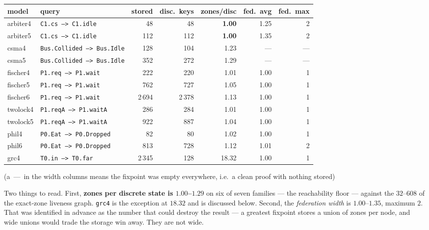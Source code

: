 \begin{center}\small
\begin{tabular}{llrrrrr}
\toprule
model & query & stored & disc.\ keys & zones/disc & fed.\ avg & fed.\ max \\
\midrule
arbiter4 & \texttt{C1.cs --> C1.idle}          & 48    & 48    & \textbf{1.00} & 1.25 & 2 \\
arbiter5 & \texttt{C1.cs --> C1.idle}          & 112   & 112   & \textbf{1.00} & 1.35 & 2 \\
csma4    & \texttt{Bus.Collided --> Bus.Idle}  & 128   & 104   & 1.23 & --- & --- \\
csma5    & \texttt{Bus.Collided --> Bus.Idle}  & 352   & 272   & 1.29 & --- & --- \\
fischer4 & \texttt{P1.req --> P1.wait}         & 222   & 220   & 1.01 & 1.00 & 1 \\
fischer5 & \texttt{P1.req --> P1.wait}         & 762   & 727   & 1.05 & 1.00 & 1 \\
fischer6 & \texttt{P1.req --> P1.wait}         & 2\,694& 2\,378& 1.13 & 1.00 & 1 \\
twolock4 & \texttt{P1.reqA --> P1.waitA}       & 286   & 284   & 1.01 & 1.00 & 1 \\
twolock5 & \texttt{P1.reqA --> P1.waitA}       & 922   & 887   & 1.04 & 1.00 & 1 \\
phil4    & \texttt{P0.Eat --> P0.Dropped}      & 82    & 80    & 1.02 & 1.00 & 1 \\
phil6    & \texttt{P0.Eat --> P0.Dropped}      & 813   & 728   & 1.12 & 1.01 & 2 \\
grc4     & \texttt{T0.in --> T0.far}           & 2\,345& 128   & 18.32& 1.00 & 1 \\
\bottomrule
\end{tabular}
\end{center}
\measured{} (a \,---\, in the width columns means the fixpoint was empty everywhere, i.e.\ a clean
proof with nothing stored)

Two things to read. First, \textbf{zones per discrete state is $1.00$--$1.29$} on six of seven
families --- the reachability floor --- against the $32$--$608$ of the exact-zone liveness graph.
\texttt{grc4} is the exception at $18.32$ and is discussed below. Second, the \emph{federation
width} is $1.00$--$1.35$, maximum $2$. That was identified in advance as the number that could
destroy the result --- a greatest fixpoint stores a union of zones per node, and wide unions would
trade the storage win away. They are not wide.

